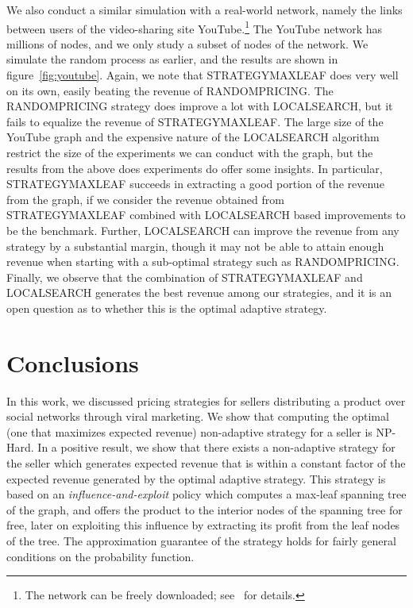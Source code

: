 \documentclass[letterpaper,twoside]{article}
\newcommand{\strategyml}{\textrm{S{\scriptsize TRATEGY}\-M{\scriptsize AX}\-L{\scriptsize EAF}}}
\newcommand{\LS}{\textrm{L{\scriptsize OCAL}\-S{\scriptsize EARCH}}}
\newcommand{\rand}{\textrm{R{\scriptsize ANDOM}\-P{\scriptsize RICING}}}
\begin{document}
We also conduct a similar simulation with a real-world network, namely the
links between users of the video-sharing site YouTube.\footnote{The network
  can be freely downloaded; see~\cite{MMGDB07} for details.}
The YouTube network has millions of nodes, and we only study a subset of
 nodes of the network. We simulate the random process as earlier, and
the results are shown in figure~\ref{fig:youtube}. Again, we note that
\strategyml{} does very well on its own, easily beating the revenue of
\rand. The \rand{} strategy does improve a lot with \LS, but it fails to
equalize the revenue of \strategyml. The large size of the YouTube graph and
the expensive nature of the \LS{} algorithm restrict the size of the
experiments we can conduct with the graph, but the results from the above
does experiments do offer some insights. In particular, \strategyml{}
succeeds in extracting a good portion of the revenue from the graph, if we
consider the revenue obtained from \strategyml{} combined with \LS{} based
improvements to be the benchmark.  Further, \LS{} can improve the revenue
from any strategy by a substantial margin, though it may not be able to
attain enough revenue when starting with a sub-optimal strategy such as
\rand. Finally, we observe that the combination of \strategyml{} and \LS{}
generates the best revenue among our strategies, and it is an open question
as to whether this is the optimal adaptive strategy.

\section{Conclusions}
In this work, we discussed pricing strategies for sellers distributing a
product over social networks through viral marketing.  We show that computing
the optimal (one that maximizes expected revenue) non-adaptive strategy for a
seller is NP-Hard. In a positive result, we show that there exists a
non-adaptive strategy for the seller which generates expected revenue that is
within a constant factor of the expected revenue generated by the optimal
adaptive strategy. This strategy is based on an {\em influence-and-exploit}
policy which computes a max-leaf spanning tree of the graph, and offers the
product to the interior nodes of the spanning tree for free, later on
exploiting this influence by extracting its profit from the leaf nodes of the
tree. The approximation guarantee of the strategy holds for fairly general
conditions on the probability function.
\end{document}
